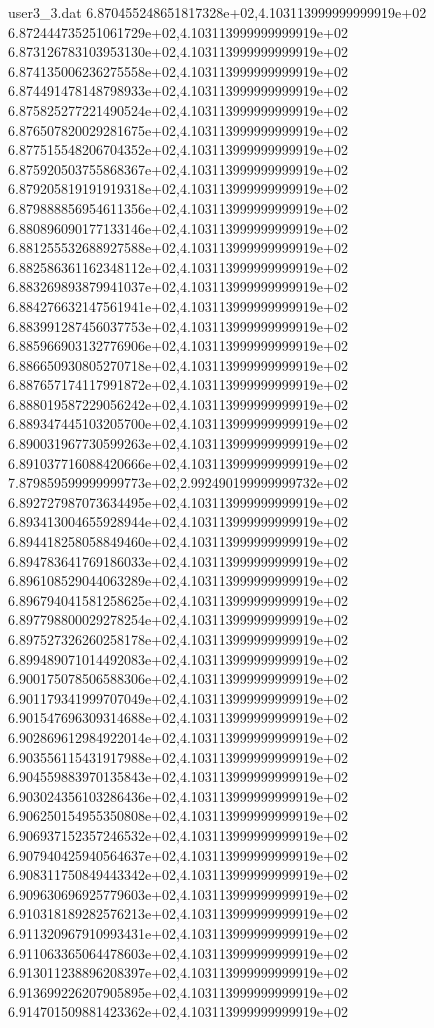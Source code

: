 \begin{filecontents}{user3_3.dat}
6.870455248651817328e+02,4.103113999999999919e+02
6.872444735251061729e+02,4.103113999999999919e+02
6.873126783103953130e+02,4.103113999999999919e+02
6.874135006236275558e+02,4.103113999999999919e+02
6.874491478148798933e+02,4.103113999999999919e+02
6.875825277221490524e+02,4.103113999999999919e+02
6.876507820029281675e+02,4.103113999999999919e+02
6.877515548206704352e+02,4.103113999999999919e+02
6.875920503755868367e+02,4.103113999999999919e+02
6.879205819191919318e+02,4.103113999999999919e+02
6.879888856954611356e+02,4.103113999999999919e+02
6.880896090177133146e+02,4.103113999999999919e+02
6.881255532688927588e+02,4.103113999999999919e+02
6.882586361162348112e+02,4.103113999999999919e+02
6.883269893879941037e+02,4.103113999999999919e+02
6.884276632147561941e+02,4.103113999999999919e+02
6.883991287456037753e+02,4.103113999999999919e+02
6.885966903132776906e+02,4.103113999999999919e+02
6.886650930805270718e+02,4.103113999999999919e+02
6.887657174117991872e+02,4.103113999999999919e+02
6.888019587229056242e+02,4.103113999999999919e+02
6.889347445103205700e+02,4.103113999999999919e+02
6.890031967730599263e+02,4.103113999999999919e+02
6.891037716088420666e+02,4.103113999999999919e+02
7.879859599999999773e+02,2.992490199999999732e+02
6.892727987073634495e+02,4.103113999999999919e+02
6.893413004655928944e+02,4.103113999999999919e+02
6.894418258058849460e+02,4.103113999999999919e+02
6.894783641769186033e+02,4.103113999999999919e+02
6.896108529044063289e+02,4.103113999999999919e+02
6.896794041581258625e+02,4.103113999999999919e+02
6.897798800029278254e+02,4.103113999999999919e+02
6.897527326260258178e+02,4.103113999999999919e+02
6.899489071014492083e+02,4.103113999999999919e+02
6.900175078506588306e+02,4.103113999999999919e+02
6.901179341999707049e+02,4.103113999999999919e+02
6.901547696309314688e+02,4.103113999999999919e+02
6.902869612984922014e+02,4.103113999999999919e+02
6.903556115431917988e+02,4.103113999999999919e+02
6.904559883970135843e+02,4.103113999999999919e+02
6.903024356103286436e+02,4.103113999999999919e+02
6.906250154955350808e+02,4.103113999999999919e+02
6.906937152357246532e+02,4.103113999999999919e+02
6.907940425940564637e+02,4.103113999999999919e+02
6.908311750849443342e+02,4.103113999999999919e+02
6.909630696925779603e+02,4.103113999999999919e+02
6.910318189282576213e+02,4.103113999999999919e+02
6.911320967910993431e+02,4.103113999999999919e+02
6.911063365064478603e+02,4.103113999999999919e+02
6.913011238896208397e+02,4.103113999999999919e+02
6.913699226207905895e+02,4.103113999999999919e+02
6.914701509881423362e+02,4.103113999999999919e+02

\end{filecontents}
